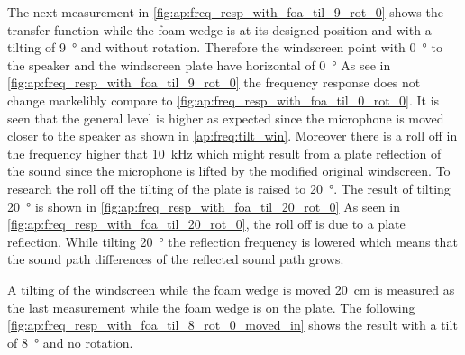 The next measurement in \autoref{fig:ap:freq_resp_with_foa_til_9_rot_0} shows the transfer function while the foam wedge is at its designed position and with a tilting of \SI{9}{\degree} and without rotation. Therefore the windscreen point with \SI{0}{\degree} to the speaker and the windscreen plate have horizontal of \SI{0}{\degree} 
As see in \autoref{fig:ap:freq_resp_with_foa_til_9_rot_0} the frequency response does not change markelibly compare to \autoref{fig:ap:freq_resp_with_foa_til_0_rot_0}. It is seen that the general level is  higher as expected since the microphone is moved closer to the speaker as shown in \autoref{ap:freq:tilt_win}.
Moreover there is a roll off in the frequency higher that \SI{10}{\kilo\hertz} which might result from a plate reflection of the sound since the microphone is lifted by the modified original windscreen. To research the roll off the tilting of the plate is raised to \SI{20}{\degree}. The result of tilting \SI{20}{\degree} is shown in \autoref{fig:ap:freq_resp_with_foa_til_20_rot_0} 
As seen in \autoref{fig:ap:freq_resp_with_foa_til_20_rot_0}, the roll off is due to a plate reflection. While tilting \SI{20}{\degree} the reflection frequency is lowered which means that the sound path differences of the reflected sound path grows. 

A tilting of the windscreen while the foam wedge is moved \SI{20}{\centi\meter} is measured as the last measurement while the foam wedge is on the plate. The following \autoref{fig:ap:freq_resp_with_foa_til_8_rot_0_moved_in} shows the result with a tilt of \SI{8}{\degree} and no rotation.

